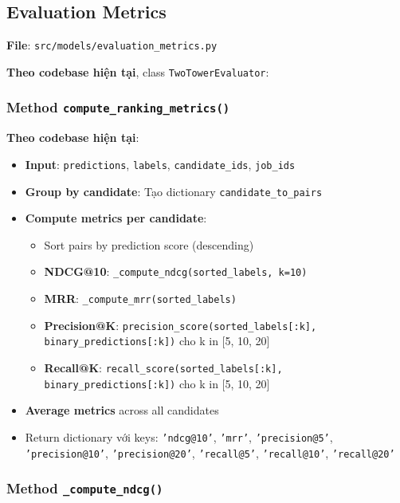 \subsection{Evaluation Metrics}

\textbf{File}: \texttt{src/models/evaluation\_metrics.py}

\textbf{Theo codebase hiện tại}, class \texttt{TwoTowerEvaluator}:

\subsubsection{Method \texttt{compute\_ranking\_metrics()}}

\textbf{Theo codebase hiện tại}:

\begin{itemize}
    \item \textbf{Input}: \texttt{predictions}, \texttt{labels}, \texttt{candidate\_ids}, \texttt{job\_ids}
    \item \textbf{Group by candidate}: Tạo dictionary \texttt{candidate\_to\_pairs}
    \item \textbf{Compute metrics per candidate}:
    \begin{itemize}
        \item Sort pairs by prediction score (descending)
        \item \textbf{NDCG@10}: \texttt{\_compute\_ndcg(sorted\_labels, k=10)}
        \item \textbf{MRR}: \texttt{\_compute\_mrr(sorted\_labels)}
        \item \textbf{Precision@K}: \texttt{precision\_score(sorted\_labels[:k], binary\_predictions[:k])} cho k in [5, 10, 20]
        \item \textbf{Recall@K}: \texttt{recall\_score(sorted\_labels[:k], binary\_predictions[:k])} cho k in [5, 10, 20]
    \end{itemize}
    \item \textbf{Average metrics} across all candidates
    \item Return dictionary với keys: \texttt{'ndcg@10'}, \texttt{'mrr'}, \texttt{'precision@5'}, \texttt{'precision@10'}, \texttt{'precision@20'}, \texttt{'recall@5'}, \texttt{'recall@10'}, \texttt{'recall@20'}
\end{itemize}

\subsubsection{Method \texttt{\_compute\_ndcg()}}

